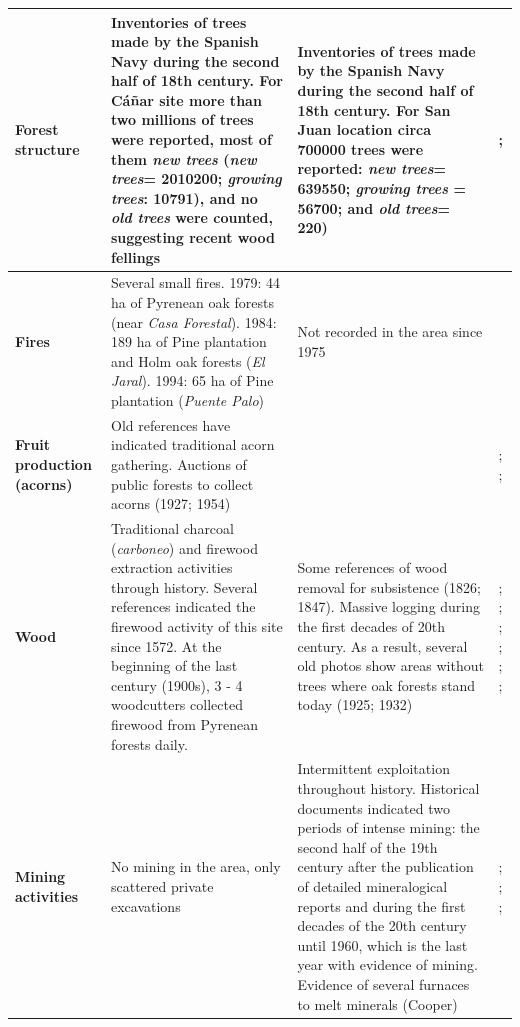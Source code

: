 \begin{table}
\begin{tabular}{
>{\centering\arraybackslash}p{}>{\raggedright\arraybackslash}p{}>{\raggedright\arraybackslash}p{}>{\raggedright\arraybackslash}p{}}
\textbf{Forest structure} & Inventories of trees made by the Spanish Navy during the second half of 18th century. For Cáñar site more than two millions of trees were reported, most of them \textit{new trees} (\textit{new trees}= 2010200;  \textit{growing trees}: 10791), and no \textit{old trees} were counted, suggesting recent wood fellings & Inventories of trees made by the Spanish Navy during the second half of 18th century. For San Juan location circa 700000 trees were reported: \textit{new trees}= 639550;  \textit{growing trees} = 56700; and \textit{old trees}= 220) & \textcite{Cruz1991}; \textcite{Wing2015} \\ \midrule
\textbf{Fires} & Several small fires. 1979: 44 ha of Pyrenean oak forests (near \textit{Casa Forestal}). 1984: 189 ha of Pine plantation and Holm oak forests (\textit{El Jaral}). 1994: 65 ha of Pine plantation (\textit{Puente Palo}) & Not recorded in the area since 1975 & \textcite{Bonet2014conama, MorenoLlorca2016,CMA2018} \\ \midrule
\textbf{Fruit production (acorns)} & Old references have indicated traditional acorn gathering. Auctions of public forests to collect acorns (1927; 1954) &  & \textcite{Bonet2014conama}; \textcite{Catastro1752}; \textcite{MesaTorres2009} \\ \midrule
\textbf{Wood} & Traditional charcoal (\textit{carboneo}) and firewood extraction activities through history. Several references indicated the firewood activity of this site since 1572. At the beginning of the last century (1900s), 3 - 4 woodcutters collected firewood from Pyrenean forests daily. & Some references of wood removal for subsistence (1826; 1847). Massive logging during the first decades of 20th century. As a result, several old photos show areas without trees where oak forests stand today (1925; 1932) & \textcite{Bonet2014conama}; \textcite{Catastro1752}; \textcite{Ferrer1999}; \textcite{Lopez1776}; \textcite{MesaTorres2009}; \textcite{Madoz1846}; \textcite{Titos1997} \\ \midrule
\textbf{Mining activities} & No mining in the area, only scattered private excavations & Intermittent exploitation throughout history. Historical documents indicated two periods of intense mining: the second half of the 19th century after the publication of detailed mineralogical reports and during the first decades of the 20th century until 1960, which is the last year with evidence of mining. Evidence of several furnaces to melt minerals (Cooper) & \textcite{Maestre1852} ; \textcite{Maestre1858}; \textcite{MesaTorres2009}; \textcite{Titos1990} \\ \midrule

\end{tabular}
\end{table}
